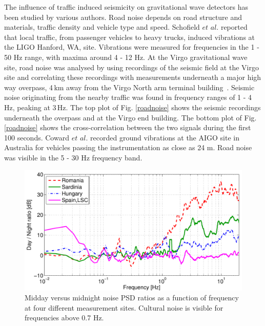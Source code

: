 The influence of traffic induced seismicity on gravitational wave detectors has been studied by various authors. Road noise depends on road structure and materials, traffic density and vehicle type and speed. Schofield $et$ $al.$ \cite{Schofield2000} reported that local traffic, from passenger vehicles to heavy trucks, induced vibrations at the LIGO Hanford, WA, site. Vibrations were measured for frequencies in the 1 - 50 Hz range, with maxima around 4 - 12 Hz. At the Virgo gravitational wave site, road noise was analysed by using recordings of the seismic field at the Virgo site and correlating these recordings with measurements underneath a major high way overpass, 4\,km away from the Virgo North arm terminal building~\cite{VIR-NOT-FIR-1390-251}. Seismic noise originating from the nearby traffic was found in frequency ranges of 1 - 4\,Hz, peaking at 3\,Hz. The top plot of Fig. \ref{roadnoise} shows the seismic recordings underneath the overpass and at the Virgo end building. The bottom plot of Fig. \ref{roadnoise} shows the cross-correlation between the two signals during the first 100 seconds. Coward $et$ $al.$ \cite{Coward2003} recorded ground vibrations at the AIGO site in Australia for vehicles passing the instrumentation as close as 24 m. Road noise was visible in the 5 - 30 Hz frequency band.
\begin{figure}[t!]
	\begin{center}
		 \includegraphics[width=14cm]{./Sec_SiteInfra/Figures/DayNightRatio.pdf}
		\caption{Midday versus midnight noise PSD ratios as a function of frequency at four different measurement sites. Cultural noise is visible for frequencies above 0.7 Hz.}
			\label{fig3.3}
	\end{center}
\end{figure}

